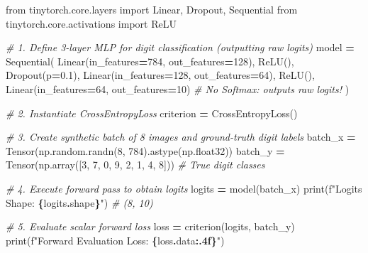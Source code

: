 \documentclass[
  letterpaper,
]{scrbook}
\newenvironment{Shaded}{\begin{snugshade}}{\end{snugshade}}
\newcommand{\BuiltInTok}[1]{#1}
\newcommand{\CommentTok}[1]{\textcolor[rgb]{0.56,0.35,0.01}{\textit{#1}}}
\newcommand{\DecValTok}[1]{\textcolor[rgb]{0.00,0.00,0.81}{#1}}
\newcommand{\FloatTok}[1]{\textcolor[rgb]{0.00,0.00,0.81}{#1}}
\newcommand{\ImportTok}[1]{#1}
\newcommand{\NormalTok}[1]{#1}
\newcommand{\OperatorTok}[1]{\textcolor[rgb]{0.81,0.36,0.00}{\textbf{#1}}}
\newcommand{\SpecialCharTok}[1]{\textcolor[rgb]{0.81,0.36,0.00}{\textbf{#1}}}
\newcommand{\SpecialStringTok}[1]{\textcolor[rgb]{0.31,0.60,0.02}{#1}}
\begin{document}
\begin{Shaded}
\begin{Highlighting}[]
\ImportTok{from}\NormalTok{ tinytorch.core.layers }\ImportTok{import}\NormalTok{ Linear, Dropout, Sequential}
\ImportTok{from}\NormalTok{ tinytorch.core.activations }\ImportTok{import}\NormalTok{ ReLU}

\CommentTok{\# 1. Define 3{-}layer MLP for digit classification (outputting raw logits)}
\NormalTok{model }\OperatorTok{=}\NormalTok{ Sequential(}
\NormalTok{    Linear(in\_features}\OperatorTok{=}\DecValTok{784}\NormalTok{, out\_features}\OperatorTok{=}\DecValTok{128}\NormalTok{),}
\NormalTok{    ReLU(),}
\NormalTok{    Dropout(p}\OperatorTok{=}\FloatTok{0.1}\NormalTok{),}
\NormalTok{    Linear(in\_features}\OperatorTok{=}\DecValTok{128}\NormalTok{, out\_features}\OperatorTok{=}\DecValTok{64}\NormalTok{),}
\NormalTok{    ReLU(),}
\NormalTok{    Linear(in\_features}\OperatorTok{=}\DecValTok{64}\NormalTok{, out\_features}\OperatorTok{=}\DecValTok{10}\NormalTok{)  }\CommentTok{\# No Softmax: outputs raw logits!}
\NormalTok{)}

\CommentTok{\# 2. Instantiate CrossEntropyLoss}
\NormalTok{criterion }\OperatorTok{=}\NormalTok{ CrossEntropyLoss()}

\CommentTok{\# 3. Create synthetic batch of 8 images and ground{-}truth digit labels}
\NormalTok{batch\_x }\OperatorTok{=}\NormalTok{ Tensor(np.random.randn(}\DecValTok{8}\NormalTok{, }\DecValTok{784}\NormalTok{).astype(np.float32))}
\NormalTok{batch\_y }\OperatorTok{=}\NormalTok{ Tensor(np.array([}\DecValTok{3}\NormalTok{, }\DecValTok{7}\NormalTok{, }\DecValTok{0}\NormalTok{, }\DecValTok{9}\NormalTok{, }\DecValTok{2}\NormalTok{, }\DecValTok{1}\NormalTok{, }\DecValTok{4}\NormalTok{, }\DecValTok{8}\NormalTok{]))  }\CommentTok{\# True digit classes}

\CommentTok{\# 4. Execute forward pass to obtain logits}
\NormalTok{logits }\OperatorTok{=}\NormalTok{ model(batch\_x)}
\BuiltInTok{print}\NormalTok{(}\SpecialStringTok{f"Logits Shape: }\SpecialCharTok{\{}\NormalTok{logits}\SpecialCharTok{.}\NormalTok{shape}\SpecialCharTok{\}}\SpecialStringTok{"}\NormalTok{)  }\CommentTok{\# (8, 10)}

\CommentTok{\# 5. Evaluate scalar forward loss}
\NormalTok{loss }\OperatorTok{=}\NormalTok{ criterion(logits, batch\_y)}
\BuiltInTok{print}\NormalTok{(}\SpecialStringTok{f"Forward Evaluation Loss: }\SpecialCharTok{\{}\NormalTok{loss}\SpecialCharTok{.}\NormalTok{data}\SpecialCharTok{:.4f\}}\SpecialStringTok{"}\NormalTok{)}
\end{Highlighting}
\end{Shaded}
\end{document}
